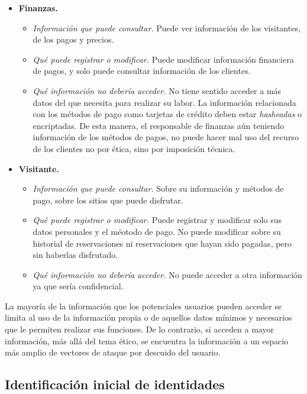 \documentclass[12pt]{article}
\begin{document}
\begin{itemize}
\begin{itemize}
		\end{itemize}
	\item \textbf{Finanzas.}
		\begin{itemize}
			\item \textit{Información que puede consultar.} Puede ver información de los visitantes, de los pagos y precios.
			\item \textit{Qué puede registrar o modificar.} Puede modificar información financiera de pagos, y solo puede consultar información de los clientes.
			\item \textit{Qué información no debería acceder.} No tiene sentido acceder a más datos del que necesita para realizar su labor. La información relacionada con los métodos de pago como tarjetas de crédito deben estar \textit{hasheadas} o encriptadas. De esta manera, el responsable de finanzas aún teniendo información de los métodos de pagos, no puede hacer mal uso del recurso de los clientes no por ética, sino por imposición técnica.
		\end{itemize}
	\item \textbf{Visitante.}
		\begin{itemize}
			\item \textit{Información que puede consultar.} Sobre su información y métodos de pago, sobre los sitios que puede disfrutar.
			\item \textit{Qué puede registrar o modificar.}
			Puede registrar y modificar solo sus datos personales y el méotodo de pago. 
			No puede modificar sobre su historial de reservaciones ni reservaciones que hayan sido pagadas, pero sin haberlas disfrutado.
			\item \textit{Qué información no debería acceder.} No puede acceder a otra información ya que sería confidencial. 
		\end{itemize}
\end{itemize}

La mayoría de la información que los potenciales usuarios pueden acceder se limita al uso de la información propia o de aquellos datos mínimos y necesarios que le permiten realizar sus funciones. De lo contrario, si acceden a mayor información, más allá del tema ético, se encuentra la información a un espacio más amplio de vectores de ataque por descuido del usuario.

\subsection*{Identificación inicial de identidades}
\end{document}
